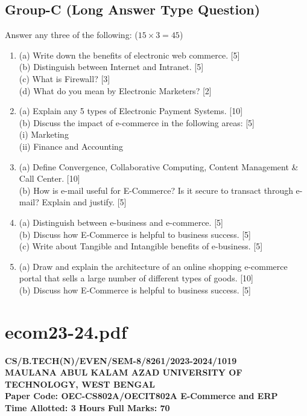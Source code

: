 \documentclass{article}
\begin{document}
\subsection*{Group-C (Long Answer Type Question)}
Answer any three of the following: ($15 \times 3 = 45$)
\begin{enumerate}
    \item[7.] 
    (a) Write down the benefits of electronic web commerce. [5] \\
    (b) Distinguish between Internet and Intranet. [5] \\
    (c) What is Firewall? [3] \\
    (d) What do you mean by Electronic Marketers? [2]
    \item[8.] 
    (a) Explain any 5 types of Electronic Payment Systems. [10] \\
    (b) Discuss the impact of e-commerce in the following areas: [5] \\
    (i) Marketing \\
    (ii) Finance and Accounting
    \item[9.] 
    (a) Define Convergence, Collaborative Computing, Content Management \& Call Center. [10] \\
    (b) How is e-mail useful for E-Commerce? Is it secure to transact through e-mail? Explain and justify. [5]
    \item[10.] 
    (a) Distinguish between e-business and e-commerce. [5] \\
    (b) Discuss how E-Commerce is helpful to business success. [5] \\
    (c) Write about Tangible and Intangible benefits of e-business. [5]
    \item[11.] 
    (a) Draw and explain the architecture of an online shopping e-commerce portal that sells a large number of different types of goods. [10] \\
    (b) Discuss how E-Commerce is helpful to business success. [5]
\end{enumerate}


\newpage
\section*{ecom23-24.pdf}
\textbf{CS/B.TECH(N)/EVEN/SEM-8/8261/2023-2024/1019} \\
\textbf{MAULANA ABUL KALAM AZAD UNIVERSITY OF TECHNOLOGY, WEST BENGAL} \\
\textbf{Paper Code: OEC-CS802A/OECIT802A \hfill E-Commerce and ERP} \\
\textbf{Time Allotted: 3 Hours \hfill Full Marks: 70}
\end{document}
